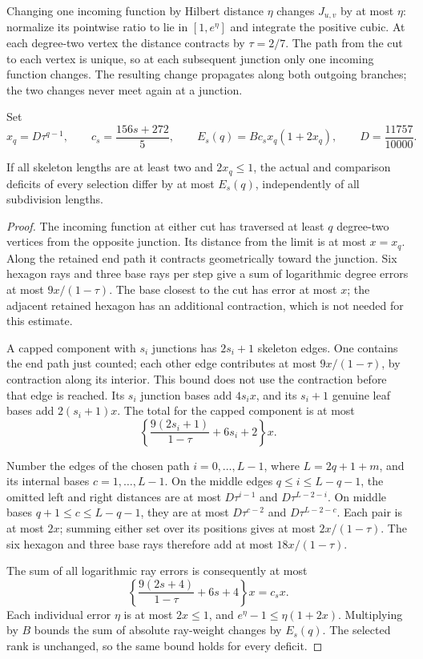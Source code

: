 Changing one incoming function by Hilbert distance $\eta$ changes
$J_{u,v}$ by at most $\eta$: normalize its pointwise ratio to lie in
$[1,e^\eta]$ and integrate the positive cubic. At each degree-two
vertex the distance contracts by $\tau=2/7$. The path from the cut to
each vertex is unique, so at each subsequent
junction only one incoming function changes. The resulting change
propagates along both outgoing branches; the two changes never meet
again at a junction.

Set
\begin{equation}\label{tree:error}
 x_q=D\tau^{q-1},\qquad
 c_s=\frac{156s+272}{5},\qquad
 E_s(q)=B c_s x_q(1+2x_q),
 \qquad D=\frac{11757}{10000}.
\end{equation}

\begin{lemma}\label{tree:comparison}
If all skeleton lengths are at least two and $2x_q\le1$, the
actual and comparison deficits of every selection differ by at most
$E_s(q)$, independently of all subdivision lengths.
\end{lemma}

\begin{proof}
The incoming function at either cut has traversed at least $q$
degree-two vertices from the opposite junction. Its distance from
the limit is at most $x=x_q$. Along the retained end path it contracts
geometrically toward the junction. Six hexagon rays and three base
rays per step give a sum of logarithmic degree errors at most
$9x/(1-\tau)$. The base closest to the cut has error at most $x$;
the adjacent retained hexagon has an additional contraction, which is
not needed for this estimate.

A capped component with $s_i$ junctions has $2s_i+1$ skeleton edges.
One contains the end path just counted; each other edge contributes at most
$9x/(1-\tau)$, by contraction along its interior. This bound does not
use the contraction before that edge is reached.
Its $s_i$ junction bases add
$4s_ix$, and its $s_i+1$ genuine leaf bases add $2(s_i+1)x$.
The total for the capped component is at most
\[
 \left\{\frac{9(2s_i+1)}{1-\tau}+6s_i+2\right\}x.
\]

Number the edges of the chosen path $i=0,\ldots,L-1$, where
$L=2q+1+m$, and its internal bases $c=1,\ldots,L-1$. On the
middle edges $q\le i\le L-q-1$, the omitted left and right
distances are at most $D\tau^{i-1}$ and $D\tau^{L-2-i}$.
On middle bases $q+1\le c\le L-q-1$, they are at most
$D\tau^{c-2}$ and $D\tau^{L-2-c}$. Each pair is at most $2x$;
summing either set over its positions gives at most $2x/(1-\tau)$.
The six hexagon and three base rays therefore add at most
$18x/(1-\tau)$.

The sum of all logarithmic ray errors is consequently at most
\[
 \left\{\frac{9(2s+4)}{1-\tau}+6s+4\right\}x=c_sx.
\]
Each individual error $\eta$ is at most $2x\le1$, and
$e^\eta-1\le\eta(1+2x)$. Multiplying by $B$ bounds the sum of
absolute ray-weight changes by $E_s(q)$. The selected rank is
unchanged, so the same bound holds for every deficit.
\end{proof}

